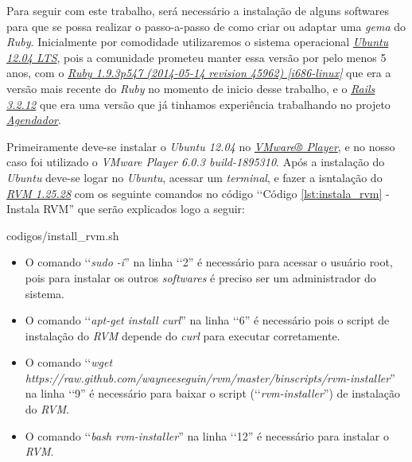 Para seguir com este trabalho, será necessário a instalação de alguns softwares para que se possa realizar
o passo-a-passo de como criar ou adaptar uma \emph{gema} do \emph{Ruby}.
Inicialmente por comodidade utilizaremos o sistema operacional 
\emph{\href{http://releases.ubuntu.com/12.04/}{Ubuntu 12.04 LTS}}, pois a comunidade prometeu manter essa 
versão por pelo menos 5 anos, com o 
\emph{\href{https://www.ruby-lang.org/en/downloads/}{Ruby 1.9.3p547 (2014-05-14 revision 45962) [i686-linux]}} 
que era a versão mais recente do \emph{Ruby} no momento de inicio desse trabalho, e o 
\emph{\href{http://rubyonrails.org/download/}{Rails 3.2.12}} que era uma versão que já tinhamos experiência
trabalhando no projeto \emph{\href{http://agendador.c3sl.ufpr.br/}{Agendador}}.

Primeiramente deve-se instalar o \emph{Ubuntu 12.04} no 
\emph{\href{https://my.vmware.com/web/vmware/free\#desktop_end_user_computing/vmware_player/}{VMware® Player}}, 
e no nosso caso foi utilizado o \emph{VMware Player 6.0.3 build-1895310}. Após a instalação do \emph{Ubuntu}
deve-se logar no \emph{Ubuntu}, acessar um \emph{terminal}, e fazer a isntalação do 
\emph{\href{https://github.com/wayneeseguin/rvm}{RVM 1.25.28}} com os seguinte comandos no código 
‘‘Código \ref{lst:instala_rvm} - Instala RVM'' que serão explicados logo a seguir:
 
 
 {codigos/install_rvm.sh}
 
\begin{itemize}

\item O comando ‘‘\emph{sudo -i}'' na linha ‘‘2'' é necessário para acessar o usuário root, pois 
  para instalar os outros \emph{softwares} é preciso ser um administrador do sistema.
  
  \item O comando ‘‘\emph{apt-get install curl}'' na linha ‘‘6'' é necessário pois o script de 
  instalação do \emph{RVM} depende do \emph{curl} para executar corretamente.
  
  \item O comando ‘‘\emph{wget https://raw.github.com/wayneeseguin/rvm/master/binscripts/rvm-installer}'' 
  na linha ‘‘9'' é necessário para baixar o script (‘‘\emph{rvm-installer}'') de instalação do \emph{RVM}.
  
  \item O comando ‘‘\emph{bash rvm-installer}'' na linha ‘‘12'' é necessário para instalar o \emph{RVM}.
  
\end{itemize}

